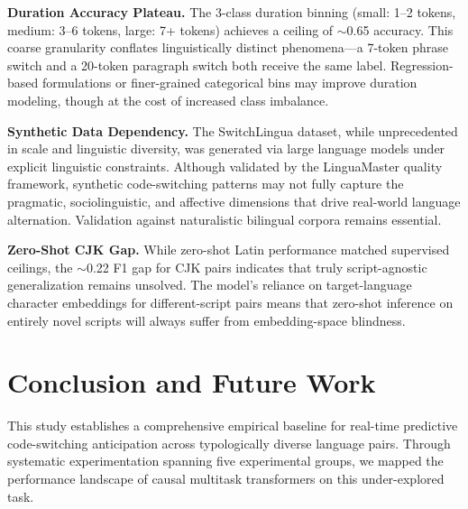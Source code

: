 \documentclass[sigconf,nonacm]{acmart}
\begin{document}
\textbf{Duration Accuracy Plateau.} The 3-class duration binning (small: 1--2 tokens, medium: 3--6 tokens, large: 7+ tokens) achieves a ceiling of $\sim$0.65 accuracy. This coarse granularity conflates linguistically distinct phenomena---a 7-token phrase switch and a 20-token paragraph switch both receive the same label. Regression-based formulations or finer-grained categorical bins may improve duration modeling, though at the cost of increased class imbalance.

\textbf{Synthetic Data Dependency.} The SwitchLingua dataset, while unprecedented in scale and linguistic diversity, was generated via large language models under explicit linguistic constraints. Although validated by the LinguaMaster quality framework, synthetic code-switching patterns may not fully capture the pragmatic, sociolinguistic, and affective dimensions that drive real-world language alternation. Validation against naturalistic bilingual corpora remains essential.

\textbf{Zero-Shot CJK Gap.} While zero-shot Latin performance matched supervised ceilings, the $\sim$0.22 F1 gap for CJK pairs indicates that truly script-agnostic generalization remains unsolved. The model's reliance on target-language character embeddings for different-script pairs means that zero-shot inference on entirely novel scripts will always suffer from embedding-space blindness.

\section{Conclusion and Future Work}
This study establishes a comprehensive empirical baseline for real-time predictive code-switching anticipation across typologically diverse language pairs. Through systematic experimentation spanning five experimental groups, we mapped the performance landscape of causal multitask transformers on this under-explored task.
\end{document}

